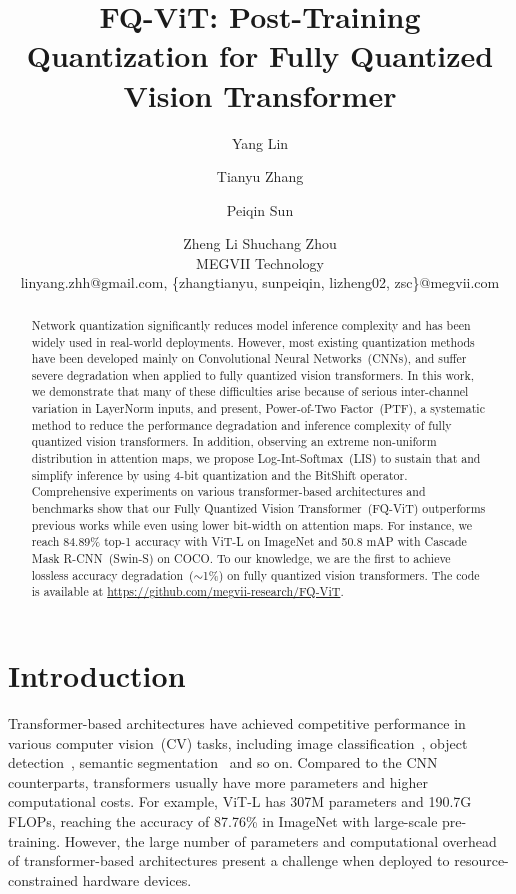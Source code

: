 \documentclass{article}
\title{FQ-ViT: Post-Training Quantization for Fully Quantized Vision Transformer}
\author{
Yang Lin\footnotemark[1]\footnotemark[2]\and
Tianyu Zhang\footnotemark[1] \and
Peiqin Sun\footnotemark[3]\and
Zheng Li \And
Shuchang Zhou\\
\affiliations
MEGVII Technology\\
\emails
linyang.zhh@gmail.com, \{zhangtianyu, sunpeiqin, lizheng02, zsc\}@megvii.com
}
\begin{document}
\maketitle

\renewcommand{\thefootnote}{\fnsymbol{footnote}}


\begin{abstract}
Network quantization significantly reduces model inference complexity and has been widely used in real-world deployments. However, most existing quantization methods have been developed mainly on Convolutional Neural Networks~(CNNs), and suffer severe degradation when applied to fully quantized vision transformers. In this work, we demonstrate that many of these difficulties arise because of serious inter-channel variation in LayerNorm inputs, and present, Power-of-Two Factor~(PTF), a systematic method to reduce the performance degradation and inference complexity of fully quantized vision transformers. In addition, observing an extreme non-uniform distribution in attention maps, we propose Log-Int-Softmax~(LIS) to sustain that and simplify inference by using 4-bit quantization and the BitShift operator. Comprehensive experiments on various transformer-based architectures and benchmarks show that our Fully Quantized Vision Transformer~(FQ-ViT) outperforms previous works while even using lower bit-width on attention maps. For instance, we reach 84.89\% top-1 accuracy with ViT-L on ImageNet and 50.8 mAP with Cascade Mask R-CNN~(Swin-S) on COCO. To our knowledge, we are the first to achieve lossless accuracy degradation~($\sim$1\%) on fully quantized vision transformers. The code is available at \url{https://github.com/megvii-research/FQ-ViT}.
\end{abstract}


\section{Introduction}

Transformer-based architectures have achieved competitive performance in various computer vision~(CV) tasks, including image classification~\cite{dosovitskiy2021an,touvron2021training}, object detection~\cite{carion2020end,liu2021swin}, semantic segmentation~\cite{zheng2021rethinking} and so on. Compared to the CNN counterparts, transformers usually have more parameters and higher computational costs. For example, ViT-L has 307M parameters and 190.7G FLOPs, reaching the accuracy of 87.76\% in ImageNet with large-scale pre-training. However, the large number of parameters and computational overhead of transformer-based architectures present a challenge when deployed to resource-constrained hardware devices.
\end{document}
